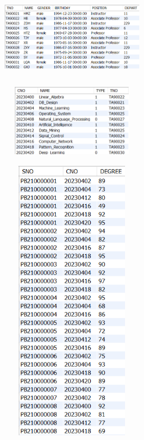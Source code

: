 \documentclass{ctexart}
\begin{document}
		\begin{figure}[H]
			\centering 
			\includegraphics[height=3.5cm,width=6cm]{3.png}
			\end{figure}
			\begin{figure}[H]
				\centering 
				\includegraphics[height=3cm,width=6cm]{4.png}
				\end{figure}
				\begin{figure}[H]
					\centering 
					\includegraphics[height=12cm,width=6cm]{5.png}
					\end{figure}
\end{document}
